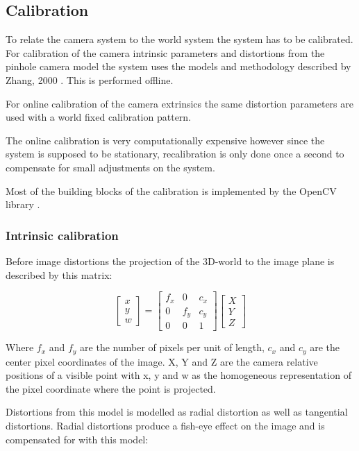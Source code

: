 
\subsection{Calibration}
To relate the camera system to the world system the system has to be calibrated. For calibration of the camera intrinsic parameters and distortions from the pinhole camera model the system uses the models and methodology described by Zhang, 2000 \cite{zhang}. This is performed offline.

For online calibration of the camera extrinsics the same distortion parameters are used with a world fixed calibration pattern.

The online calibration is very computationally expensive however since the system is supposed to be stationary, recalibration is only done once a second to compensate for small adjustments on the system.

Most of the building blocks of the calibration is implemented by the OpenCV library \cite{camcal}. 

\subsubsection{Intrinsic calibration}
Before image distortions the projection of the 3D-world to the image plane is described by this matrix:

\[\begin{bmatrix}
x \\
y \\
w
\end{bmatrix}
=
\begin{bmatrix}
 f_x & 0   & c_x \\ 
 0   & f_y & c_y \\ 
 0   & 0   & 1
\end{bmatrix}
\begin{bmatrix}
X \\
Y \\
Z
\end{bmatrix}\] 

Where $f_x$ and $f_y$ are the number of pixels per unit of length, $c_x$ and $c_y$ are the center pixel coordinates of the image. X, Y and Z are the camera relative positions of a visible point with x, y and w as the homogeneous representation of the pixel coordinate where the point is projected.

Distortions from this model is modelled as radial distortion as well as tangential distortions. Radial distortions produce a fish-eye effect on the image and is compensated for with this model:

